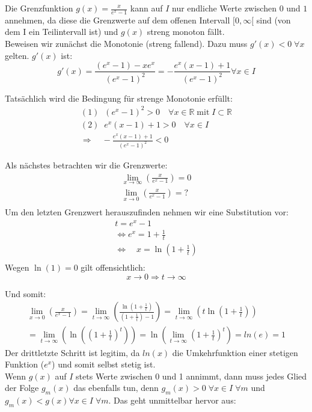 \documentclass[a4paper,german,12pt,smallheadings]{scrartcl}
\begin{document}
Die Grenzfunktion $g(x)=\frac{x}{e^x-1}$ kann auf $I$ nur endliche Werte zwischen $0$ und $1$ annehmen, da diese die Grenzwerte auf dem offenen Intervall $[0,\infty[$ sind (von dem I ein Teilintervall ist) und $g(x)$ streng monoton fällt.\\

Beweisen wir zunächst die Monotonie (streng fallend). Dazu muss $g'(x)<0 \; \forall x$ gelten. $g'(x)$ ist:
\begin{equation*}
g'(x)=\frac{(e^x-1)-xe^x}{(e^x-1)^2}=-\frac{e^x(x-1)+1}{(e^x-1)^2} \forall x\in I
\end{equation*}

Tatsächlich wird die Bedingung für strenge Monotonie erfüllt:
\begin{align*}
(1)\;\; (e^x-1)^2 > 0 \quad \forall x\in\mathbb{R}\; \text{mit}\; I\subset\mathbb{R}\\
(2)\;\; e^x(x-1)+1 > 0 \quad \forall x \in I\\
\Rightarrow \quad -\frac{e^x(x-1)+1}{(e^x-1)^2}<0
\end{align*}

Als nächstes betrachten wir die Grenzwerte:
\begin{align*}
\lim\limits_{x \to \infty}\left(\frac{x}{e^x-1}\right)=0\\
\lim\limits_{x \to 0}\left(\frac{x}{e^x-1}\right)=?\\
\end{align*}
Um den letzten Grenzwert herauszufinden nehmen wir eine Substitution vor:
\begin{align*}
t=e^x-1\\
\Leftrightarrow e^x=1+\frac{1}{t}\\
\Leftrightarrow \quad x=\ln(1+\frac{1}{t})\\
\end{align*}
Wegen $\ln(1)=0$ gilt offensichtlich:
\begin{equation*}
x\rightarrow0 \Rightarrow t\rightarrow \infty
\end{equation*}

Und somit:
\begin{align*}
\lim\limits_{x \to 0}\left(\frac{x}{e^x-1}\right)=\lim\limits_{t \to \infty}\left(\frac{\ln(1+\frac{1}{t})}{\left(1+\frac{1}{t}\right)-1}\right)=\lim\limits_{t\to\infty}\left(t\ln(1+\frac{1}{t})\right)\\
=\lim\limits_{t\to\infty}\left(\ln\left(\left(1+\frac{1}{t}\right)^t\right)\right)=\ln\left(\lim\limits_{t \to \infty}\left(1+\frac{1}{t}\right)^t\right)=ln(e)=1
\end{align*}
Der drittletzte Schritt ist legitim, da $ln(x)$ die Umkehrfunktion einer stetigen Funktion ($e^x$) und somit selbst stetig ist.\\
Wenn $g(x)$ auf $I$ stets Werte zwischen 0 und 1 annimmt, dann muss jedes Glied der Folge $g_m(x)$ das ebenfalls tun, denn $g_m(x) > 0 \; \forall x\in I \; \forall m$ und $g_m(x) < g(x) \forall x\in I \; \forall m$. Das geht unmittelbar hervor aus:
\end{document}

